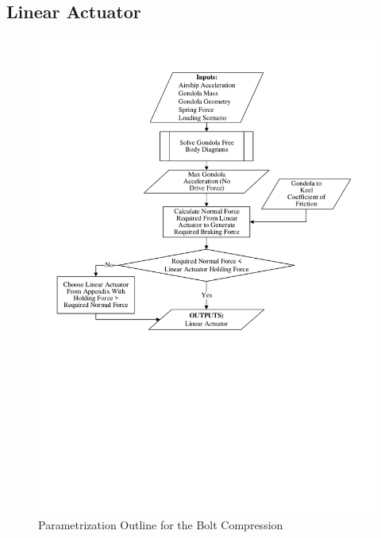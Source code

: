 \documentclass[../main.tex]{subfiles}
\begin{document}
\subsection{Linear Actuator} 
\label{linearActuator}
\begin{figure}[H]
	\centering
	\includegraphics[width=\linewidth]{img/paramaterization/linearActuator.pdf}
	\caption{Parametrization Outline for the Bolt Compression}
	\label{fig:linearActuatorParametrization}
\end{figure}
\end{document}
